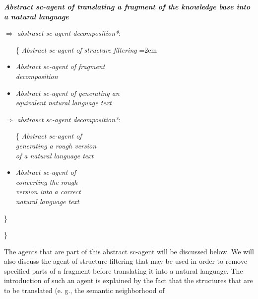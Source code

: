 \documentclass{scndocument}
\begin{document}
\begin{SCn}
\begin{multicols}{2}
\begin{flushleft}
\vspace{0.4cm}
\textbf{\textit{Abstract sc-agent of translating a fragment of the knowledge base into a natural language}}
\end{flushleft}
\begin{spacing}{0.65}
\hspace{-3cm} $\Rightarrow$ {\textit{abstrasct sc-agent decomposition*}}:\par
\begin{itemize}
\itemsep0em
\vspace{-0.3cm}
\item [\{ \bullet] \textit{Abstract sc-agent of structure filtering} \leftskip=2em  
\item \textit{Abstract sc-agent of fragment \\ decomposition}
\item \textit{Abstract sc-agent of generating an \\ equivalent natural language text}
\end{itemize}
\vspace{-0.3cm}
\hspace{1cm}$\Rightarrow$ {\textit{abstrasct sc-agent decomposition*}}:
\begin{itemize} \leftskip=7em
\itemsep0em
\vspace{-0.3cm}
\item [\{ \bullet] \textit{Abstract sc-agent of \\ generating a rough version \\ of a natural language text}
\item  \textit{Abstract sc-agent of \\ converting the rough \\ version into a correct \\ natural language text}
\end{itemize}
\end{spacing}
\newpage
\hspace{-2cm}\} \par
\hspace{-6cm} \} \par
\begin{justify}
The agents that are part of this abstract sc-agent will
be discussed below. We will also discuss the agent of
structure filtering that may be used in order to remove
specified parts of a fragment before translating it into
a natural language. The introduction of such an agent
is explained by the fact that the structures that are
to be translated (e. g., the semantic neighborhood of

\end{justify}
\end{multicols}
\end{SCn}
\end{document}
